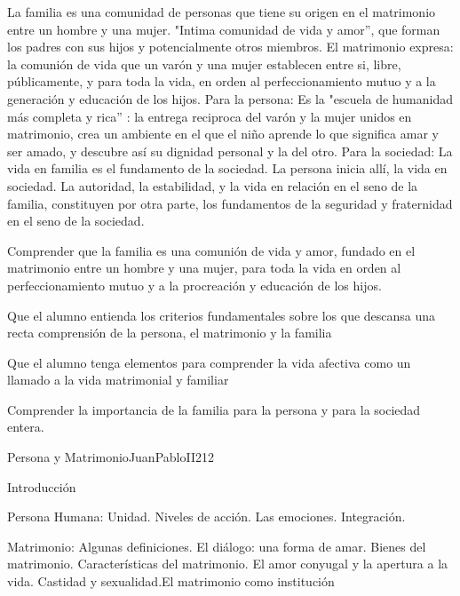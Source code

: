\begin{syllabus}


\begin{justification}
La familia es una comunidad de personas que tiene su origen en el matrimonio entre un hombre y una mujer. "Intima comunidad de vida y amor'', que forman los padres con sus hijos y potencialmente otros miembros.   El matrimonio expresa: la comunión de vida que un varón y una mujer establecen entre si, libre, públicamente, y para toda la vida, en orden al perfeccionamiento mutuo y a la generación y educación de los hijos. 
Para la persona: Es la "escuela de humanidad más completa y rica'' : la entrega reciproca del varón y la mujer unidos en matrimonio, crea  un ambiente en el que el niño aprende lo que significa amar y ser amado, y descubre así su dignidad personal y la del otro. 
Para la sociedad: La vida en familia es el fundamento de la sociedad. La persona inicia allí, la vida en sociedad. La autoridad, la estabilidad, y la vida en relación en el seno de la familia, constituyen por otra parte, los fundamentos de la seguridad y fraternidad en el seno de la sociedad. 
\end{justification}

\begin{goals}
	\item Comprender que la familia es una comunión de vida y amor, fundado en el matrimonio entre un hombre y una mujer, para toda la vida en orden al perfeccionamiento mutuo y a la procreación y educación de los hijos.
	\item Que el alumno entienda los criterios fundamentales sobre los que descansa una recta comprensión de la persona, el matrimonio y la familia
	\item Que el alumno tenga elementos para comprender la vida afectiva como un llamado a la vida matrimonial y familiar
	\item Comprender la importancia de la familia para la persona y para la sociedad entera.
\end{goals}

\begin{outcomes}
\end{outcomes}

\begin{unit}{Persona y Matrimonio}{JuanPabloII}{21}{2}
\begin{topics}
	\item Introducción 
	\item Persona Humana: Unidad. Niveles de acción. Las emociones. Integración. 
	\item Matrimonio: Algunas definiciones. El diálogo: una forma de amar. Bienes del matrimonio. Características del matrimonio. El amor conyugal y la apertura a la vida. Castidad  y sexualidad.El matrimonio como institución  
\end{topics}


\end{unit}
\end{syllabus}
